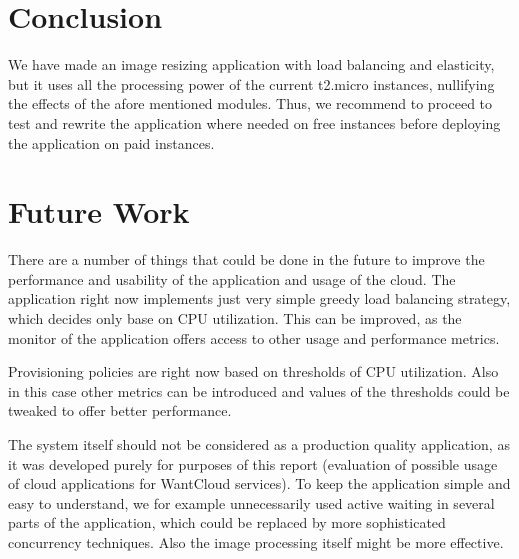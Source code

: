 \section{Conclusion}
\label{con}
We have made an image resizing application with load balancing and elasticity, but it uses all the processing power of the current t2.micro instances, nullifying the effects of the afore mentioned modules. Thus, we recommend to proceed to test and rewrite the application where needed on free instances before deploying the application on paid instances. 

\section{Future Work}
There are a number of things that could be done in the future to improve the performance and usability of the application and usage of the cloud. The application right now implements just very simple greedy load balancing strategy, which decides only base on CPU utilization. This can be improved, as the monitor of the application offers access to other usage and performance metrics.

Provisioning policies are right now based on thresholds of CPU utilization. Also in this case other metrics can be introduced and values of the thresholds could be tweaked to offer better performance.

The system itself should not be considered as a production quality application, as it was developed purely for purposes of this report (evaluation of possible usage of cloud applications for WantCloud services). To keep the application simple and easy to understand, we for example unnecessarily used active waiting in several parts of the application, which could be replaced by more sophisticated concurrency techniques. Also the image processing itself might be more effective.